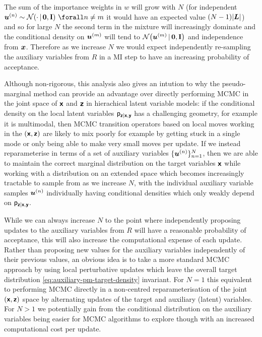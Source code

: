 The sum of the importance weights in $w$ will grow with $N$ (for independent $\vct{u}^{(n)} \sim \nrm{\cdot \gvn \vct{0},\mathbf{I}} ~\forall n \neq m$ it would have an expected value $(N-1)|\boldsymbol{L}|$) and so for large $N$ the second term in the mixture will increasingly dominate and the conditional density on $\boldsymbol{u}^{(m)}$ will tend to $\nrm{\vct{u}^{(m)}\gvn\vct{0},\mathbf{I}}$ and independence from $\boldsymbol{x}$. Therefore as we increase $N$ we would expect independently re-sampling the auxiliary variables from $R$ in a \ac{MI} step to have an increasing probability of acceptance.

Although non-rigorous, this analysis also gives an intution to why the pseudo-marginal method can provide an advantage over directly performing \ac{MCMC} in the joint space of $\boldsymbol{\mathsf{x}}$ and $\boldsymbol{\mathsf{z}}$ in hierachical latent variable models: if the conditional density on the local latent variables $\mathsf{p}_{\boldsymbol{\mathsf{z}}|\boldsymbol{\mathsf{x}},\boldsymbol{\mathsf{y}}}$ has a challenging geometry, for example it is multimodal, then \ac{MCMC} transition operators based on local moves working in the $(\boldsymbol{\mathsf{x}},\boldsymbol{\mathsf{z}})$ are likely to mix poorly for example by getting stuck in a single mode or only being able to make very small moves per update. If we instead reparameterise in terms of a set of auxiliary variables $\lbrace \boldsymbol{u}^{(n)} \rbrace_{n=1}^N$, then we are able to maintain the correct marginal distribution on the target variables $\boldsymbol{\mathsf{x}}$ while working with a distribution on an extended space which becomes increasingly tractable to sample from as we increase $N$, with the individual auxiliary variable samples $\boldsymbol{u}^{(n)}$ individually having conditional densities which only weakly depend on $\mathsf{p}_{\boldsymbol{\mathsf{z}}|\boldsymbol{\mathsf{x}},\boldsymbol{\mathsf{y}}}$.

While we can always increase $N$ to the point where independently proposing updates to the auxiliary variables from $R$ will have a reasonable probability of acceptance, this will also increase the computational expense of each update. Rather than proposing new values for the auxiliary variables independently of their previous values, an obvious idea is to take a more standard \ac{MCMC} approach by using local perturbative updates which leave the overall target distribution \eqref{eq:auxiliary-pm-target-density} invariant. For $N=1$ this equivalent to performing \ac{MCMC} directly in a non-centred reparameterisation \citep{papaspiliopoulos2003non} of the joint $(\boldsymbol{\mathsf{x}},\boldsymbol{\mathsf{z}})$ space by alternating updates of the target and auxiliary (latent) variables. For $N > 1$ we potentially gain from the conditional distribution on the auxiliary variables being easier for \ac{MCMC} algorithms to explore though with an increased computational cost per update.

